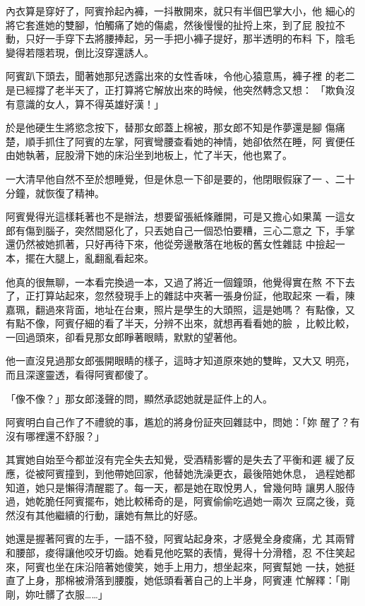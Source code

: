 內衣算是穿好了，阿賓拎起內褲，一抖散開來，就只有半個巴掌大小，他
細心的將它套進她的雙腳，怕觸痛了她的傷處，然後慢慢的扯捋上來，到了屁
股拉不動，只好一手穿下去將腰捧起，另一手把小褲子提好，那半透明的布料
下，陰毛變得若隱若現，倒比沒穿還誘人。

阿賓趴下頭去，聞著她那兒透露出來的女性香味，令他心猿意馬，褲子裡
的老二是已經撐了老半天了，正打算將它解放出來的時候，他突然轉念又想：
「欺負沒有意識的女人，算不得英雄好漢！」

於是他硬生生將慾念按下，替那女郎蓋上棉被，那女郎不知是作夢還是腳
傷痛楚，順手抓住了阿賓的左掌，阿賓彎腰查看她的神情，她卻依然在睡，阿
賓便任由她執著，屁股滑下她的床沿坐到地板上，忙了半天，他也累了。

一大清早他自然不至於想睡覺，但是休息一下卻是要的，他閉眼假寐了一
、二十分鐘，就恢復了精神。

阿賓覺得光這樣耗著也不是辦法，想要留張紙條離開，可是又擔心如果萬
一這女郎有傷到腦子，突然間惡化了，只丟她自己一個恐怕要糟，三心二意之
下，手掌還仍然被她抓著，只好再待下來，他從旁邊散落在地板的舊女性雜誌
中撿起一本，擺在大腿上，亂翻亂看起來。

他真的很無聊，一本看完換過一本，又過了將近一個鐘頭，他覺得實在熬
不下去了，正打算站起來，忽然發現手上的雜誌中夾著一張身份証，他取起來
一看，陳嘉珮，翻過來背面，地址在台東，照片是學生的大頭照，這是她嗎？
有點像，又有點不像，阿賓仔細的看了半天，分辨不出來，就想再看看她的臉
，比較比較，一回過頭來，卻看見那女郎睜著眼睛，默默的望著他。

他一直沒見過那女郎張開眼睛的樣子，這時才知道原來她的雙眸，又大又
明亮，而且深邃靈透，看得阿賓都傻了。

「像不像？」那女郎淺聲的問，顯然承認她就是証件上的人。

阿賓明白自己作了不禮貌的事，尷尬的將身份証夾回雜誌中，問她：「妳
醒了？有沒有哪裡還不舒服？」

其實她自始至今都並沒有完全失去知覺，受酒精影響的是失去了平衡和遲
緩了反應，從被阿賓撞到，到他帶她回家，他替她洗澡更衣，最後陪她休息，
過程她都知道，她只是懶得清醒罷了。每一天，都是她在取悅男人，曾幾何時
讓男人服侍過，她乾脆任阿賓擺布，她比較稀奇的是，阿賓偷偷吃過她一兩次
豆腐之後，竟然沒有其他繼續的行動，讓她有無比的好感。

她還是握著阿賓的左手，一語不發，阿賓站起身來，才感覺全身痠痛，尤
其兩臂和腰部，痠得讓他咬牙切齒。她看見他吃緊的表情，覺得十分滑稽，忍
不住笑起來，阿賓也坐在床沿陪著她傻笑，她手上用力，想坐起來，阿賓幫她
一扶，她挺直了上身，那棉被滑落到腰腹，她低頭看著自己的上半身，阿賓連
忙解釋：「剛剛，妳吐髒了衣服……」

